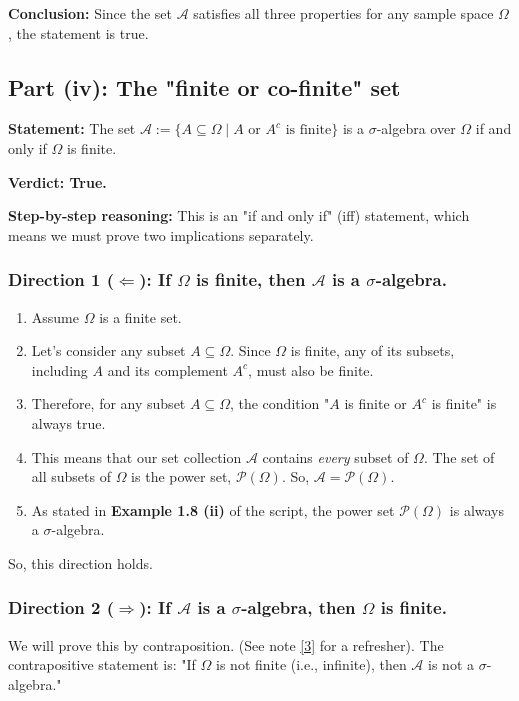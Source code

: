 \documentclass[11pt,a4paper]{article}
\begin{document}
\textbf{Conclusion:} Since the set $\mathcal{A}$ satisfies all three properties for any sample space $\Omega$, the statement is true.

\subsection{Part (iv): The "finite or co-finite" set}
\textbf{Statement:} The set $\mathcal{A} := \{A \subseteq \Omega \mid A \text{ or } A^c \text{ is finite}\}$ is a $\sigma$-algebra over $\Omega$ if and only if $\Omega$ is finite.

\textbf{Verdict: True.}

\textbf{Step-by-step reasoning:}
This is an "if and only if" (iff) statement, which means we must prove two implications separately.

\subsubsection{Direction 1 (\texorpdfstring{$\Leftarrow$}{<=}): If \texorpdfstring{$\Omega$}{Omega} is finite, then \texorpdfstring{$\mathcal{A}$}{A} is a \texorpdfstring{$\sigma$}{sigma}-algebra.}
\begin{enumerate}
    \item Assume $\Omega$ is a finite set.
    \item Let's consider any subset $A \subseteq \Omega$. Since $\Omega$ is finite, any of its subsets, including $A$ and its complement $A^c$, must also be finite.
    \item Therefore, for any subset $A \subseteq \Omega$, the condition "$A$ is finite or $A^c$ is finite" is always true.
    \item This means that our set collection $\mathcal{A}$ contains \textit{every} subset of $\Omega$. The set of all subsets of $\Omega$ is the power set, $\mathcal{P}(\Omega)$. So, $\mathcal{A} = \mathcal{P}(\Omega)$.
    \item As stated in \textbf{Example 1.8 (ii)} of the script, the power set $\mathcal{P}(\Omega)$ is always a $\sigma$-algebra.
\end{enumerate}
So, this direction holds.

\subsubsection{Direction 2 (\texorpdfstring{$\Rightarrow$}{=>}): If \texorpdfstring{$\mathcal{A}$}{A} is a \texorpdfstring{$\sigma$}{sigma}-algebra, then \texorpdfstring{$\Omega$}{Omega} is finite.}
We will prove this by contraposition. (See note \hyperlink{note3}{[3]} for a refresher). The contrapositive statement is: "If $\Omega$ is not finite (i.e., infinite), then $\mathcal{A}$ is not a $\sigma$-algebra."
\end{document}
